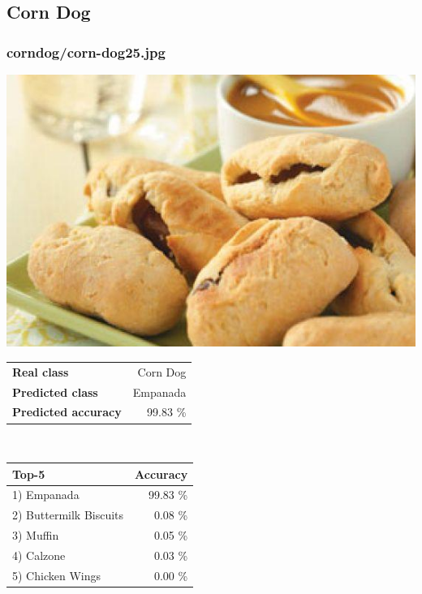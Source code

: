 \subsection{Corn Dog}
    
\subsubsection{corn\textunderscore dog/corn-dog25.jpg}

\begin{minipage}[t]{0.4\textwidth}
	\vspace{0pt}
	\includegraphics[width=\linewidth]{images/evaluation-images/corn_dog/corn-dog25.jpg}
\end{minipage}
\hfill
\begin{minipage}[t]{0.5\textwidth}
	\vspace{0pt}\raggedright
	\begin{tabularx}{\textwidth}{X r}
		\small \textbf{Real class} & \small Corn Dog\\
		\small \textbf{Predicted class} & \small Empanada\\
		\small \textbf{Predicted accuracy} & \small 99.83 \%
    \end{tabularx}\\
    
    \vspace{6pt}
	\begin{tabularx}{\textwidth}{X r}
        \small \textbf{Top-5} & \small \textbf{Accuracy} \\
        \hline
		\small 1) Empanada & \small 99.83 \%\\\small 2) Buttermilk Biscuits & \small 0.08 \%\\\small 3) Muffin & \small 0.05 \%\\\small 4) Calzone & \small 0.03 \%\\\small 5) Chicken Wings & \small 0.00 \%
    \end{tabularx}
\end{minipage}
    
